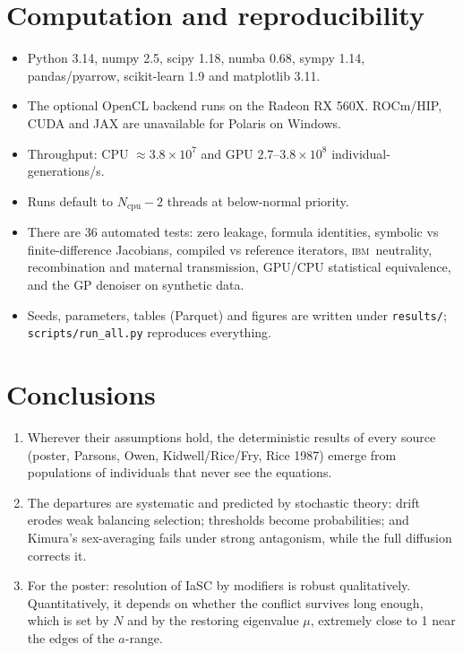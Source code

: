 \documentclass[11pt,a4paper]{article}
\newcommand{\IBM}{\textsc{ibm}}
\begin{document}
\section{Computation and reproducibility}
\begin{itemize}
\item Python 3.14, numpy 2.5, scipy 1.18, numba 0.68, sympy 1.14, pandas/pyarrow, scikit-learn 1.9 and matplotlib 3.11.
\item The optional OpenCL backend runs on the Radeon RX 560X. ROCm/HIP, CUDA and JAX are unavailable for Polaris on Windows.
\item Throughput: CPU $\approx3.8\times10^{7}$ and GPU $2.7$--$3.8\times10^{8}$ individual-generations/s.
\item Runs default to $N_\text{cpu}-2$ threads at below-normal priority.
\item There are 36 automated tests: zero leakage, formula identities, symbolic vs finite-difference Jacobians, compiled vs reference iterators, \IBM\ neutrality, recombination and maternal transmission, GPU/CPU statistical equivalence, and the GP denoiser on synthetic data.
\item Seeds, parameters, tables (Parquet) and figures are written under \texttt{results/}; \texttt{scripts/run\_all.py} reproduces everything.
\end{itemize}

\section{Conclusions}
\begin{enumerate}
\item Wherever their assumptions hold, the deterministic results of every source (poster, Parsons, Owen, Kidwell/Rice/Fry, Rice 1987) emerge from populations of individuals that never see the equations.
\item The departures are systematic and predicted by stochastic theory: drift erodes weak balancing selection; thresholds become probabilities; and Kimura's sex-averaging fails under strong antagonism, while the full diffusion corrects it.
\item For the poster: resolution of IaSC by modifiers is robust qualitatively. Quantitatively, it depends on whether the conflict survives long enough, which is set by $N$ and by the restoring eigenvalue $\mu$, extremely close to 1 near the edges of the $a$-range.
\end{enumerate}
\end{document}
